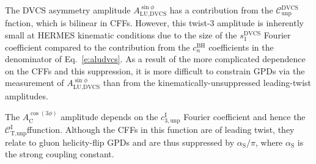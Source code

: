 The DVCS asymmetry amplitude $A^{\sin\phi}_{\textrm{LU,DVCS}}$ has a
contribution from the $\mathcal{C}_{\textrm{unp}}^{\textrm{DVCS}}$\red{-}fnction,
which is bilinear in CFFs. However, this twist-3 amplitude is inherently small at HERMES kinematic conditions due to the size of the $s_{1}^{\textrm{DVCS}}$ Fourier coefficient compared to the contribution from the $c_{n}^{\textrm{BH}}$ coefficients in the denominator of Eq.~\ref{e:aludvcs}. As a result of
the more complicated dependence on the CFFs and this suppression, it
is more difficult to constrain GPDs
via the measurement of $A^{\sin\phi}_{\textrm{LU,DVCS}}$ than from the
kinematically-unsuppressed leading-twist amplitudes.

The $A^{\cos(3\phi)}_{\textrm{C}}$ amplitude depends on the
$c_{3,\textrm{unp}}^{\textrm{I}}$ Fourier coefficient and hence the
$\mathcal{C}_{\textrm{T,unp}}^{\textrm{I}}$\red{-}ffunction. Although the CFFs
in this function are of leading twist, they relate to gluon helicity-flip GPDs and are thus suppressed by $\alpha_{\textrm{S}}/\pi$,
where $\alpha_{\textrm{S}}$ is the strong coupling constant.
